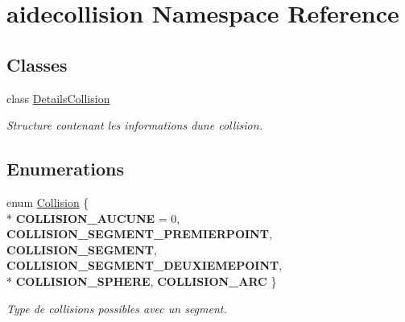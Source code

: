 \hypertarget{namespaceaidecollision}{}\section{aidecollision Namespace Reference}
\label{namespaceaidecollision}
\subsection*{Classes}
\begin{DoxyCompactItemize}
\item 
class \hyperlink{classaidecollision_1_1_details_collision}{Details\+Collision}
\begin{DoxyCompactList}\small\item\em Structure contenant les informations d\textquotesingle{}une collision. \end{DoxyCompactList}\end{DoxyCompactItemize}
\subsection*{Enumerations}
\begin{DoxyCompactItemize}
\item 
\hypertarget{namespaceaidecollision_a1c8613e2393aa3268262f9d23d60c0c9}{}enum \hyperlink{namespaceaidecollision_a1c8613e2393aa3268262f9d23d60c0c9}{Collision} \{ \\*
{\bfseries C\+O\+L\+L\+I\+S\+I\+O\+N\+\_\+\+A\+U\+C\+U\+N\+E} = 0, 
{\bfseries C\+O\+L\+L\+I\+S\+I\+O\+N\+\_\+\+S\+E\+G\+M\+E\+N\+T\+\_\+\+P\+R\+E\+M\+I\+E\+R\+P\+O\+I\+N\+T}, 
{\bfseries C\+O\+L\+L\+I\+S\+I\+O\+N\+\_\+\+S\+E\+G\+M\+E\+N\+T}, 
{\bfseries C\+O\+L\+L\+I\+S\+I\+O\+N\+\_\+\+S\+E\+G\+M\+E\+N\+T\+\_\+\+D\+E\+U\+X\+I\+E\+M\+E\+P\+O\+I\+N\+T}, 
\\*
{\bfseries C\+O\+L\+L\+I\+S\+I\+O\+N\+\_\+\+S\+P\+H\+E\+R\+E}, 
{\bfseries C\+O\+L\+L\+I\+S\+I\+O\+N\+\_\+\+A\+R\+C}
 \}\label{namespaceaidecollision_a1c8613e2393aa3268262f9d23d60c0c9}
\begin{DoxyCompactList}\small\item\em Type de collisions possibles avec un segment. \end{DoxyCompactList}
\end{DoxyCompactItemize}

